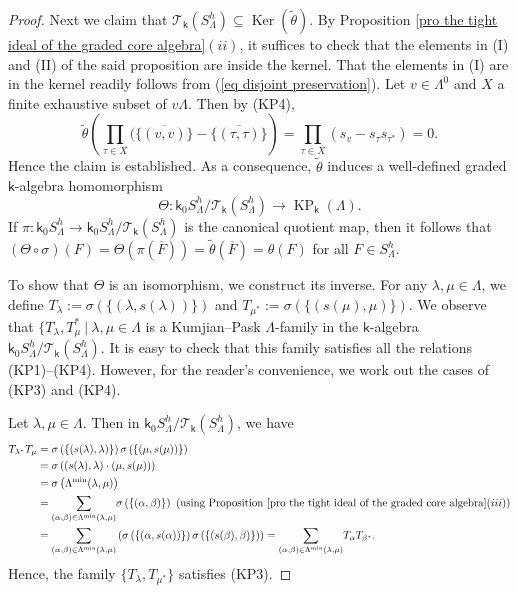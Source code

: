 \documentclass[a4paper,reqno,11pt]{amsart}
\numberwithin{equation}{section}
\theoremstyle{definition}
\theoremstyle{remark}
\newcommand{\Ker}{\operatorname{Ker}}
\newcommand{\KP}{\operatorname{KP}}
\begin{document}
\begin{proof}
Next we claim that $\mathcal{T}_\mathsf{k}(S_\Lambda^h)\subseteq \Ker(\tilde{\theta})$. By Proposition \ref{pro the tight ideal of the graded core algebra}$(ii)$, it suffices to check that the elements in (I) and (II) of the said proposition are inside the kernel. That the elements in (I) are in the kernel readily follows from (\ref{eq disjoint preservation}). Let $v\in \Lambda^0$ and $X$ a finite exhaustive subset of $v\Lambda$. Then by (KP4), \[\tilde{\theta}\left(\displaystyle{\prod_{\tau\in X}}(\overline{\{(v,v)\}}-\overline{\{(\tau,\tau)\}}\right)=\displaystyle{\prod_{\tau\in X}}(s_v-s_\tau s_{\tau^*})=0.\] Hence the claim is established. As a consequence, $\tilde{\theta}$ induces a well-defined graded $\mathsf{k}$-algebra homomorphism \[\Theta:\mathsf{k}_0S_\Lambda^h/{\mathcal{T}_\mathsf{k}(S_\Lambda^h)}\longrightarrow \KP_\mathsf{k}(\Lambda).\] If $\pi:\mathsf{k}_0S_\Lambda^h\longrightarrow \mathsf{k}_0S_\Lambda^h/{\mathcal{T}_\mathsf{k}(S_\Lambda^h)}$ is the canonical quotient map, then it follows that $(\Theta\circ \sigma) (F)=\Theta(\pi(\overline{F}))=\tilde{\theta}(\overline{F})=\theta(F)$ for all $F\in S_\Lambda^h$.

To show that $\Theta$ is an isomorphism, we construct its inverse. For any $\lambda,\mu\in \Lambda$, we define $T_\lambda:=\sigma\left(\{(\lambda,s(\lambda))\}\right)$ and $T_{\mu^*}:=\sigma\left(\{(s(\mu),\mu)\}\right)$. We observe that $\{T_\lambda,T_\mu^*~|~\lambda,\mu\in \Lambda$ is a Kumjian--Pask $\Lambda$-family in the $\mathsf{k}$-algebra $\mathsf{k}_0S_\Lambda^h/{\mathcal{T}_\mathsf{k}(S_\Lambda^h)}$. It is easy to check that this family satisfies all the relations (KP1)--(KP4). However, for the reader's convenience, we work out the cases of (KP3) and (KP4). 

Let $\lambda,\mu\in \Lambda$. Then in $\mathsf{k}_0S_\Lambda^h/{\mathcal{T}_\mathsf{k}(S_\Lambda^h)}$, we have 
\begin{align*}
T_{\lambda^*}T_\mu&=\sigma\left(\{(s(\lambda),\lambda)\}\right)\sigma\left(\{(\mu,s(\mu))\}\right)\\
&=\sigma\left((s(\lambda),\lambda)\cdot (\mu,s(\mu))\right)\\
&=\sigma\left(\Lambda^{\min}(\lambda,\mu)\right)\\
&=\displaystyle{\sum_{(\alpha,\beta)\in \Lambda^{\min}(\lambda,\mu)}}\sigma\left(\{(\alpha,\beta)\}\right)~(\text{using Proposition \ref{pro the tight ideal of the graded core algebra}}(iii))\\
&=\displaystyle{\sum_{(\alpha,\beta)\in \Lambda^{\min}(\lambda,\mu)}}\left(\sigma\left(\{(\alpha,s(\alpha))\}\right)\sigma\left(\{(s(\beta),\beta)\}\right)\right)=\displaystyle{\sum_{(\alpha,\beta)\in \Lambda^{\min}(\lambda,\mu)}}T_\alpha T_{\beta^*}.
\end{align*}
Hence, the family $\{T_\lambda,T_{\mu^*}\}$ satisfies (KP3).


\end{proof}
\end{document}
